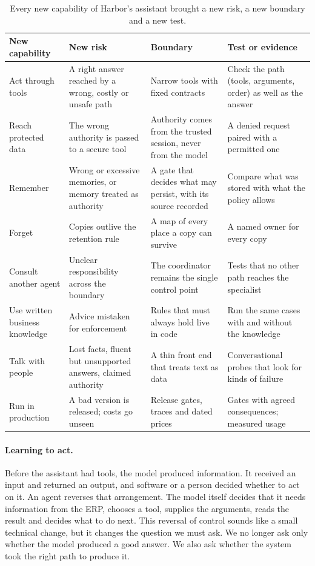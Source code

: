 \begin{table}[htbp]
\centering
\small
\caption{Every new capability of Harbor's assistant brought a new risk, a new boundary and a new test.}
\label{tab:journey}
\begin{tabularx}{\textwidth}{@{}>{\raggedright\arraybackslash}p{2.5cm}>{\raggedright\arraybackslash}X>{\raggedright\arraybackslash}X>{\raggedright\arraybackslash}X@{}}
\toprule
\rowcolor{coHead} New capability & \cellcolor{coRedBg}New risk & \cellcolor{coBlueBg}Boundary & \cellcolor{coGreenBg}Test or evidence \\
\midrule
Act through tools & A right answer reached by a wrong, costly or unsafe path & Narrow tools with fixed contracts & Check the path (tools, arguments, order) as well as the answer \\
Reach protected data & The wrong authority is passed to a secure tool & Authority comes from the trusted session, never from the model & A denied request paired with a permitted one \\
Remember & Wrong or excessive memories, or memory treated as authority & A gate that decides what may persist, with its source recorded & Compare what was stored with what the policy allows \\
Forget & Copies outlive the retention rule & A map of every place a copy can survive & A named owner for every copy \\
Consult another agent & Unclear responsibility across the boundary & The coordinator remains the single control point & Tests that no other path reaches the specialist \\
Use written business knowledge & Advice mistaken for enforcement & Rules that must always hold live in code & Run the same cases with and without the knowledge \\
Talk with people & Lost facts, fluent but unsupported answers, claimed authority & A thin front end that treats text as data & Conversational probes that look for kinds of failure \\
Run in production & A bad version is released; costs go unseen & Release gates, traces and dated prices & Gates with agreed consequences; measured usage \\
\bottomrule
\end{tabularx}
\end{table}

\paragraph{Learning to act.} Before the assistant had tools, the model produced information. It received an input and returned an output, and software or a person decided whether to act on it. An agent reverses that arrangement. The model itself decides that it needs information from the ERP, chooses a tool, supplies the arguments, reads the result and decides what to do next. This reversal of control sounds like a small technical change, but it changes the question we must ask. We no longer ask only whether the model produced a good answer. We also ask whether the system took the right path to produce it.

